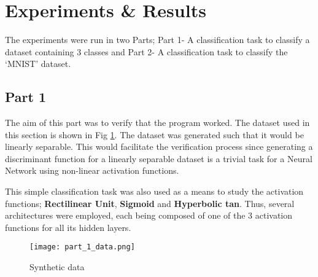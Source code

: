 \section{Experiments \& Results}

The experiments were run in two Parts; Part 1- A classification task to classify a dataset containing 3 classes and 
Part 2- A classification task to classify the `MNIST' dataset.

\subsection{Part 1}

The aim of this part was to verify that the program 
worked. The dataset used in this section is shown in Fig \ref{fig: Synthetic data}.
The dataset was generated such that it would be linearly 
separable. This would facilitate the verification process
since generating a discriminant function for a linearly 
separable dataset is a trivial task for a Neural Network
using non-linear activation functions. 

This simple classification task was also used as a means
to study the activation functions; \textbf{Rectilinear Unit}, 
\textbf{Sigmoid} and \textbf{Hyperbolic tan}. Thus, several
architectures were employed, each being composed of 
one of the 3 activation functions for all its hidden layers.


\begin{figure}
    \centering
    \texttt{[image: part\_1\_data.png]}
    \caption[short]{Synthetic data}
    \label{fig: Synthetic data}
\end{figure}
